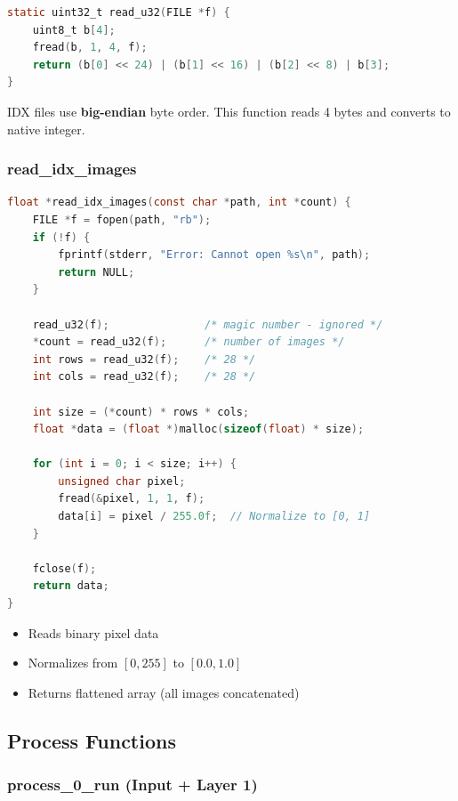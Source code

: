 \documentclass[11pt,a4paper]{article}
\begin{document}
\begin{lstlisting}[language=C, caption={Big-endian 32-bit read}]
static uint32_t read_u32(FILE *f) {
    uint8_t b[4];
    fread(b, 1, 4, f);
    return (b[0] << 24) | (b[1] << 16) | (b[2] << 8) | b[3];
}
\end{lstlisting}

IDX files use \textbf{big-endian} byte order. This function reads 4 bytes and converts to native integer.

\subsubsection{read\_idx\_images}

\begin{lstlisting}[language=C, caption={Reading MNIST images}]
float *read_idx_images(const char *path, int *count) {
    FILE *f = fopen(path, "rb");
    if (!f) {
        fprintf(stderr, "Error: Cannot open %s\n", path);
        return NULL;
    }

    read_u32(f);               /* magic number - ignored */
    *count = read_u32(f);      /* number of images */
    int rows = read_u32(f);    /* 28 */
    int cols = read_u32(f);    /* 28 */

    int size = (*count) * rows * cols;
    float *data = (float *)malloc(sizeof(float) * size);

    for (int i = 0; i < size; i++) {
        unsigned char pixel;
        fread(&pixel, 1, 1, f);
        data[i] = pixel / 255.0f;  // Normalize to [0, 1]
    }

    fclose(f);
    return data;
}
\end{lstlisting}

\begin{itemize}
    \item Reads binary pixel data
    \item Normalizes from $[0, 255]$ to $[0.0, 1.0]$
    \item Returns flattened array (all images concatenated)
\end{itemize}

\subsection{Process Functions}

\subsubsection{process\_0\_run (Input + Layer 1)}
\end{document}
